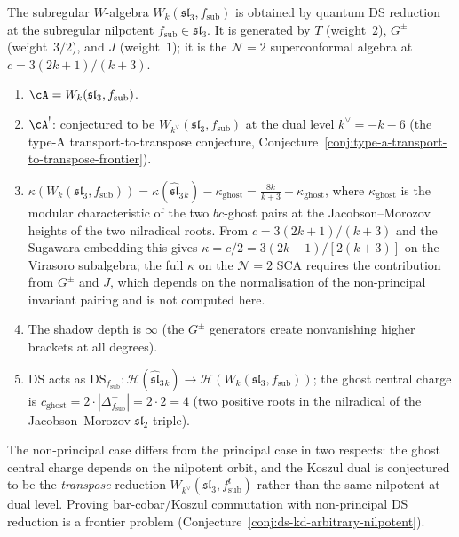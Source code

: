 \begin{computation}
\label{comp:subregular-sl3-holographic-datum}
The subregular $W$-algebra
$W_k(\mathfrak{sl}_3,f_{\mathrm{sub}})$ is obtained by
quantum DS reduction at the subregular nilpotent
$f_{\mathrm{sub}}\in\mathfrak{sl}_3$. It is generated by
$T$ (weight~$2$), $G^\pm$ (weight~$3/2$), and $J$ (weight~$1$);
it is the $\mathcal N=2$ superconformal algebra at
$c = 3(2k+1)/(k+3)$.
\begin{enumerate}[label=\textup{(\roman*)}]
\item $\cA = W_k(\mathfrak{sl}_3,f_{\mathrm{sub}})$.
\item $\cA^!$: conjectured to be
 $W_{k^\vee}(\mathfrak{sl}_3,f_{\mathrm{sub}})$
 at the dual level $k^\vee=-k-6$
 (the type-A transport-to-transpose conjecture,
 Conjecture~\ref{conj:type-a-transport-to-transpose-frontier}).
\item $\kappa(W_k(\mathfrak{sl}_3,f_{\mathrm{sub}}))
 = \kappa(\widehat{\mathfrak{sl}}_3{}_k)
 - \kappa_{\mathrm{ghost}}
 = \frac{8k}{k+3} - \kappa_{\mathrm{ghost}}$,
 where $\kappa_{\mathrm{ghost}}$ is the modular characteristic
 of the two $bc$-ghost pairs at the Jacobson--Morozov heights of
 the two nilradical roots. From
 $c = 3(2k+1)/(k+3)$ and the Sugawara embedding this gives
 $\kappa = c/2 = 3(2k+1)/[2(k+3)]$ on the Virasoro subalgebra;
 the full $\kappa$ on the $\mathcal{N}{=}2$ SCA requires the
 contribution from $G^\pm$ and $J$, which depends on the
 normalisation of the non-principal invariant pairing
 and is not computed here.
\item The shadow depth is $\infty$ (the $G^\pm$ generators
 create nonvanishing higher brackets at all degrees).
\item DS acts as
 $\mathrm{DS}_{f_{\mathrm{sub}}}\colon
 \mathcal H(\widehat{\mathfrak{sl}}_3{}_k)
 \to \mathcal H(W_k(\mathfrak{sl}_3,f_{\mathrm{sub}}))$;
 the ghost central charge is
 $c_{\mathrm{ghost}} = 2\cdot|\Delta^+_{f_{\mathrm{sub}}}|
 = 2\cdot 2 = 4$
 (two positive roots in the nilradical of the
 Jacobson--Morozov $\mathfrak{sl}_2$-triple).
\end{enumerate}
The non-principal case differs from the principal case in two
respects: the ghost central charge depends on the nilpotent
orbit, and the Koszul dual is conjectured to be the
\emph{transpose} reduction
$W_{k^\vee}(\mathfrak{sl}_3,f_{\mathrm{sub}}^t)$
rather than the same nilpotent at dual level. Proving
bar-cobar/Koszul commutation with non-principal DS reduction
is a frontier problem
(Conjecture~\ref{conj:ds-kd-arbitrary-nilpotent}).
\end{computation}

